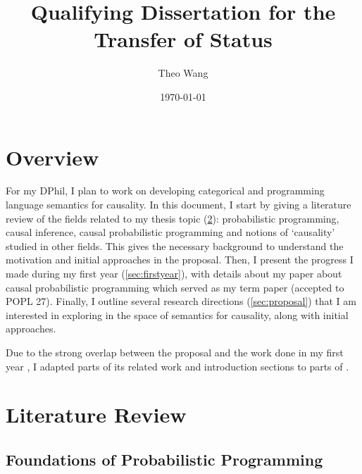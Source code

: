 \documentclass[11pt,a4paper]{article}
\title{Qualifying Dissertation for the Transfer of Status}
\author{Theo Wang}
\date{\today}
\begin{document}
\maketitle

\tableofcontents

\section{Overview}

For my DPhil, I plan to work on developing categorical and programming language semantics for causality. In this document, I start by giving a literature review of the fields related to my thesis topic (\cref{sec:litreview}): probabilistic programming, causal inference, causal probabilistic programming and notions of `causality' studied in other fields. This gives the necessary background to understand the motivation and initial approaches in the proposal. Then, I present the progress I made during my first year (\cref{sec:firstyear}), with details about my paper about causal probabilistic programming which served as my term paper \cite{wang2026causalppl} (accepted to POPL 27). Finally, I outline several research directions (\cref{sec:proposal}) that I am interested in exploring in the space of semantics for causality, along with initial approaches. 

Due to the strong overlap between the proposal and the work done in my first year \cite{wang2026causalppl}, I adapted parts of its related work and introduction sections to parts of . 

\section{Literature Review}\label{sec:litreview}

\subsection{Foundations of Probabilistic Programming}\label{sec:ppl}
\end{document}
